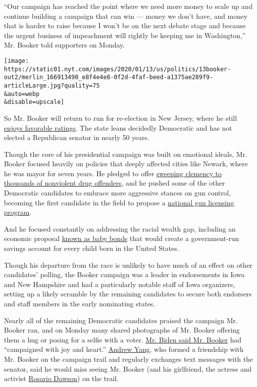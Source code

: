 ``Our campaign has reached the point where we need more money to scale
up and continue building a campaign that can win --- money we don't
have, and money that is harder to raise because I won't be on the next
debate stage and because the urgent business of impeachment will rightly
be keeping me in Washington,'' Mr. Booker told supporters on Monday.

\texttt{[image: https://static01.nyt.com/images/2020/01/13/us/politics/13booker-out2/merlin\_166913490\_e8f4e4e8-0f2d-4faf-beed-a1375ae289f9-articleLarge.jpg?quality=75\\\&auto=webp\\\&disable=upscale]}

So Mr. Booker will return to run for re-election in New Jersey, where he
still
\href{https://www.monmouth.edu/polling-institute/reports/monmouthpoll_nj_091919/}{enjoys
favorable ratings}. The state leans decidedly Democratic and has not
elected a Republican senator in nearly 50 years.

Though the core of his presidential campaign was built on emotional
ideals, Mr. Booker focused heavily on policies that deeply affected
cities like Newark, where he was mayor for seven years. He pledged to
offer
\href{https://www.nytimes.com/2019/06/20/us/politics/booker-drugs-clemency.html}{sweeping
clemency to thousands of nonviolent drug offenders}, and he pushed some
of the other Democratic candidates to embrace more aggressive stances on
gun control, becoming the first candidate in the field to propose a
\href{https://www.nytimes.com/2019/05/06/us/politics/cory-booker-gun-control.html}{national
gun licensing program}.

And he focused constantly on addressing the racial wealth gap, including
an economic proposal
\href{https://www.nytimes.com/2019/04/06/us/politics/cory-booker-2020-baby-bonds.html}{known
as baby bonds} that would create a government-run savings account for
every child born in the United States.

Though his departure from the race is unlikely to have much of an effect
on other candidates' polling, the Booker campaign was a leader in
endorsements in Iowa and New Hampshire and had a particularly notable
staff of Iowa organizers, setting up a likely scramble by the remaining
candidates to secure both endorsers and staff members in the early
nominating states.

Nearly all of the remaining Democratic candidates praised the campaign
Mr. Booker ran, and on Monday many shared photographs of Mr. Booker
offering them a hug or posing for a selfie with a voter.
\href{https://twitter.com/JoeBiden/status/1216758302421352451}{Mr. Biden
said Mr. Booker} had ``campaigned with joy and heart.''
\href{https://www.nytimes.com/interactive/2020/us/elections/andrew-yang.html}{Andrew
Yang}, who formed a friendship with Mr. Booker on the campaign trail and
regularly exchanges text messages with the senator, said he would miss
seeing Mr. Booker (and his girlfriend, the actress and activist
\href{https://www.nytimes.com/2019/12/08/us/politics/rosario-dawson-cory-booker-iowa.html}{Rosario
Dawson}) on the trail.

